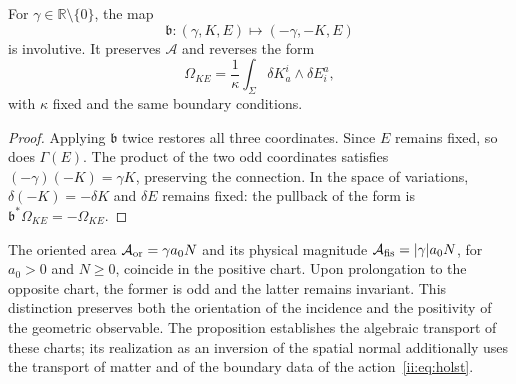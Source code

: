 \begin{proposition}
\label{ii:prop:ii-costura-barbero}
For \(\gamma\in\mathbb R\setminus\{0\}\), the map
\[
 \mathfrak b:(\gamma,K,E)\longmapsto(-\gamma,-K,E)
\]
is involutive. It preserves \(\mathcal A\) and reverses the form
\[
 \Omega_{KE}=\frac1\kappa\int_\Sigma
 \delta K_a^i\wedge\delta E^a_i,
\]
with \(\kappa\) fixed and the same boundary conditions.
\end{proposition}
\begin{proof}
Applying \(\mathfrak b\) twice restores all three coordinates.
Since \(E\) remains fixed, so does \(\Gamma(E)\).
The product of the two odd coordinates satisfies
\((-\gamma)(-K)=\gamma K\), preserving the connection.
In the space of variations, \(\delta(-K)=-\delta K\) and
\(\delta E\) remains fixed: the pullback of the form is
\(\mathfrak b^*\Omega_{KE}=-\Omega_{KE}\).
\end{proof}

The oriented area \(\mathcal A_{\rm or}=\gamma a_0N\) and its
physical magnitude \(\mathcal A_{\rm fis}=|\gamma|a_0N\), for
\(a_0>0\) and \(N\geq0\), coincide in the positive chart.
Upon prolongation to the opposite chart, the former is odd and the latter
remains invariant. This distinction preserves both the orientation
of the incidence and the positivity of the geometric observable.
The proposition establishes the algebraic transport of these charts;
its realization as an inversion of the spatial normal additionally
uses the transport of matter and of the boundary data
of the action~\eqref{ii:eq:holst}.
